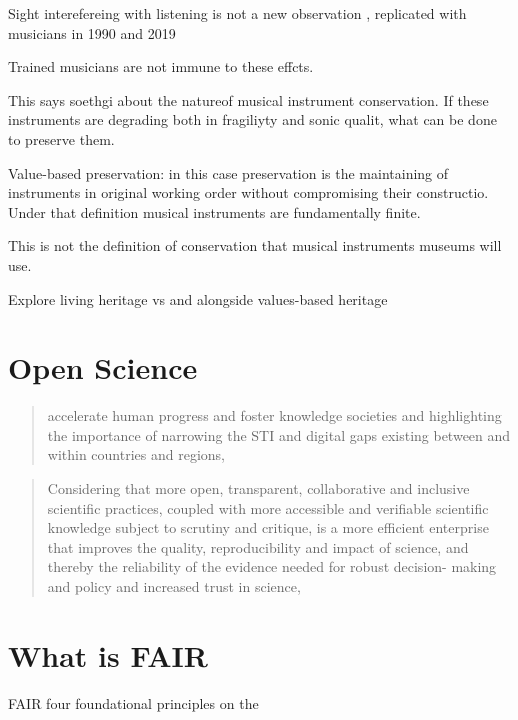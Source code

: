 Sight interefereing with listening is not a new observation \cite{mcgurk_hearing_1976}, replicated with musicians in 1990 \cite{saidana_mcgurk_1990} and 2019 \cite{politzer_mcgurk_2019}

Trained musicians are not immune to these effcts.

This says soethgi about the natureof musical instrument conservation. If these instruments are degrading both in fragiliyty and sonic qualit, what can be done to preserve them.

Value-based preservation: in this case preservation is the maintaining of instruments in original working order without compromising their constructio. Under that definition musical instruments are fundamentally finite.

This is not the definition of conservation that musical instruments museums will use.

Explore living heritage \cite{poulios_moving_2010} vs and alongside values-based heritage

\section{Open Science}

\cite{unesco_open_2021}

\begin{quote}
    accelerate human progress and foster knowledge societies and highlighting the importance of narrowing the STI and digital gaps existing between and within countries and regions,
\end{quote}

\begin{quote}
Considering that more open, transparent, collaborative and inclusive scientific practices, coupled with more accessible and verifiable scientific knowledge subject to scrutiny and critique, is a more efficient enterprise that improves the quality, reproducibility and impact of science, and thereby the reliability of the evidence needed for robust decision- making and policy and increased trust in science,
\end{quote}


\cite{wilkinson_fair_2016}

\section{What is FAIR}

FAIR \cite{wilkinson_fair_2016} four foundational principles on the

